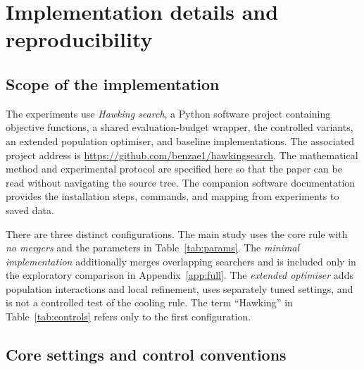 \documentclass[10pt,a4paper]{article}
\begin{document}



\appendix

\section{Implementation details and reproducibility}
\label{app:repro}

\subsection{Scope of the implementation}

The experiments use \emph{Hawking search}, a Python software project containing
objective functions, a shared evaluation-budget wrapper, the controlled
variants, an extended population optimiser, and baseline implementations. The
associated project address is
\url{https://github.com/benzae1/hawkingsearch}. The mathematical method and
experimental protocol are specified here so that the paper can be read without
navigating the source tree. The companion software documentation provides the
installation steps, commands, and mapping from experiments to saved data.

There are three distinct configurations. The main study uses the core rule
with \emph{no mergers} and the parameters in Table~\ref{tab:params}. The
\emph{minimal implementation} additionally merges overlapping searchers and is
included only in the exploratory comparison in Appendix~\ref{app:full}. The
\emph{extended optimiser} adds population interactions and local refinement,
uses separately tuned settings, and is not a controlled test of the cooling
rule. The term ``Hawking'' in Table~\ref{tab:controls} refers only to the first
configuration.

\subsection{Core settings and control conventions}
\end{document}
